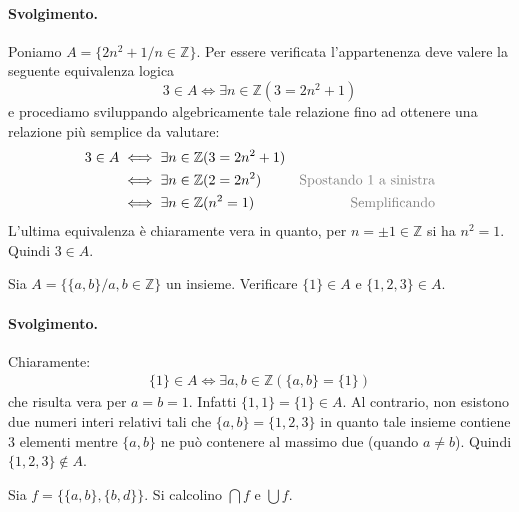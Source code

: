 \paragraph{Svolgimento.} Poniamo $A=\{2n^{2}+1 / n \in \mathbb{Z}\}$. Per essere verificata l'appartenenza deve valere la seguente equivalenza logica
\begin{displaymath}
	3 \in A \iff \exists n \in \mathbb{Z}(3=2n^{2}+1)
\end{displaymath}
e procediamo sviluppando algebricamente tale relazione fino ad ottenere una relazione più semplice da valutare:
\begin{align*}
	3 \in A &\iff \exists n \in \mathbb{Z}(3=2n^{2}+1)\\
	&\iff \exists n \in \mathbb{Z}(2=2n^{2}) & \text{\textcolor{gray}{Spostando 1 a sinistra}}\\
	&\iff \exists n \in \mathbb{Z}(n^{2}=1) & \text{\textcolor{gray}{Semplificando}}
\end{align*}
L'ultima equivalenza è chiaramente vera in quanto, per $n=\pm 1 \in \mathbb{Z}$ si ha $n^{2}=1$. Quindi $3 \in A$. \hfill \blacksquare
\begin{exsbox}
	Sia $A= \{\{a,b\}/a,b \in \mathbb{Z}\}$ un insieme. Verificare $\{1\} \in A$ e $\{1,2,3\} \in A$.
\end{exsbox}
\paragraph{Svolgimento.} Chiaramente:
\begin{align*}
	\{1\} \in A \iff \exists a,b \in \mathbb{Z}(\{a,b\} = \{1\})
\end{align*}
che risulta vera per $a=b=1$. Infatti $\{1,1\}=\{1\} \in A$. Al contrario, non esistono due numeri interi relativi tali che $\{a,b\}=\{1,2,3\}$ in quanto tale insieme contiene 3 elementi mentre $\{a,b\}$ ne può contenere al massimo due (quando $a \neq b$). Quindi $\{1,2,3\} \notin A$. \hfill \blacksquare
\begin{exsbox}
	Sia $f=\{\{a,b\},\{b,d\}\}$. Si calcolino $\bigcap f$ e $\bigcup f$.
\end{exsbox}
